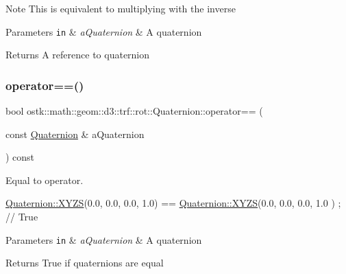 \begin{DoxyNote}{Note}
This is equivalent to multiplying with the inverse
\end{DoxyNote}

\begin{DoxyParams}[1]{Parameters}
\mbox{\tt in}  & {\em a\+Quaternion} & A quaternion \\
\hline
\end{DoxyParams}
\begin{DoxyReturn}{Returns}
A reference to quaternion 
\end{DoxyReturn}
\mbox{\label{classostk_1_1math_1_1geom_1_1d3_1_1trf_1_1rot_1_1_quaternion_ae95e1de89cdc0cb22ef4c3e3b1330279}} 
\subsubsection{\texorpdfstring{operator==()}{operator==()}}
{\footnotesize\ttfamily bool ostk\+::math\+::geom\+::d3\+::trf\+::rot\+::\+Quaternion\+::operator== (\begin{DoxyParamCaption}\item[{const \hyperlink{classostk_1_1math_1_1geom_1_1d3_1_1trf_1_1rot_1_1_quaternion}{Quaternion} \&}]{a\+Quaternion }\end{DoxyParamCaption}) const}



Equal to operator. 


\begin{DoxyCode}
\hyperlink{classostk_1_1math_1_1geom_1_1d3_1_1trf_1_1rot_1_1_quaternion_ac57ea57a4033622ed1389101b2e58c76}{Quaternion::XYZS}(0.0, 0.0, 0.0, 1.0) == \hyperlink{classostk_1_1math_1_1geom_1_1d3_1_1trf_1_1rot_1_1_quaternion_ac57ea57a4033622ed1389101b2e58c76}{Quaternion::XYZS}(0.0, 0.0, 0.0, 1.0
      ) ; \textcolor{comment}{// True}
\end{DoxyCode}



\begin{DoxyParams}[1]{Parameters}
\mbox{\tt in}  & {\em a\+Quaternion} & A quaternion \\
\hline
\end{DoxyParams}
\begin{DoxyReturn}{Returns}
True if quaternions are equal 
\end{DoxyReturn}
\mbox{\label{classostk_1_1math_1_1geom_1_1d3_1_1trf_1_1rot_1_1_quaternion_a43e3a5770d4543534712cea86fb0202b}} 

